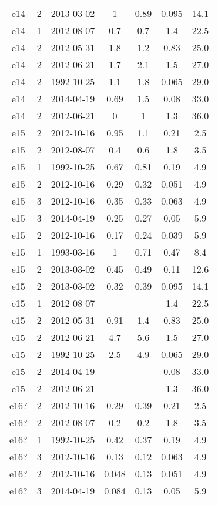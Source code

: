\begin{table*}[htp]
\begin{tabular}{ccccccc}
e14 & 2 & 2013-03-02 & 1 & 0.89 & 0.095 & 14.1 \\
e14 & 1 & 2012-08-07 & 0.7 & 0.7 & 1.4 & 22.5 \\
e14 & 2 & 2012-05-31 & 1.8 & 1.2 & 0.83 & 25.0 \\
e14 & 2 & 2012-06-21 & 1.7 & 2.1 & 1.5 & 27.0 \\
e14 & 2 & 1992-10-25 & 1.1 & 1.8 & 0.065 & 29.0 \\
e14 & 2 & 2014-04-19 & 0.69 & 1.5 & 0.08 & 33.0 \\
e14 & 2 & 2012-06-21 & 0 & 1 & 1.3 & 36.0 \\
e15 & 2 & 2012-10-16 & 0.95 & 1.1 & 0.21 & 2.5 \\
e15 & 2 & 2012-08-07 & 0.4 & 0.6 & 1.8 & 3.5 \\
e15 & 1 & 1992-10-25 & 0.67 & 0.81 & 0.19 & 4.9 \\
e15 & 2 & 2012-10-16 & 0.29 & 0.32 & 0.051 & 4.9 \\
e15 & 3 & 2012-10-16 & 0.35 & 0.33 & 0.063 & 4.9 \\
e15 & 3 & 2014-04-19 & 0.25 & 0.27 & 0.05 & 5.9 \\
e15 & 2 & 2012-10-16 & 0.17 & 0.24 & 0.039 & 5.9 \\
e15 & 1 & 1993-03-16 & 1 & 0.71 & 0.47 & 8.4 \\
e15 & 2 & 2013-03-02 & 0.45 & 0.49 & 0.11 & 12.6 \\
e15 & 2 & 2013-03-02 & 0.32 & 0.39 & 0.095 & 14.1 \\
e15 & 1 & 2012-08-07 & - & - & 1.4 & 22.5 \\
e15 & 2 & 2012-05-31 & 0.91 & 1.4 & 0.83 & 25.0 \\
e15 & 2 & 2012-06-21 & 4.7 & 5.6 & 1.5 & 27.0 \\
e15 & 2 & 1992-10-25 & 2.5 & 4.9 & 0.065 & 29.0 \\
e15 & 2 & 2014-04-19 & - & - & 0.08 & 33.0 \\
e15 & 2 & 2012-06-21 & - & - & 1.3 & 36.0 \\
e16? & 2 & 2012-10-16 & 0.29 & 0.39 & 0.21 & 2.5 \\
e16? & 2 & 2012-08-07 & 0.2 & 0.2 & 1.8 & 3.5 \\
e16? & 1 & 1992-10-25 & 0.42 & 0.37 & 0.19 & 4.9 \\
e16? & 3 & 2012-10-16 & 0.13 & 0.12 & 0.063 & 4.9 \\
e16? & 2 & 2012-10-16 & 0.048 & 0.13 & 0.051 & 4.9 \\
e16? & 3 & 2014-04-19 & 0.084 & 0.13 & 0.05 & 5.9 \\

\end{tabular}
\end{table*}
